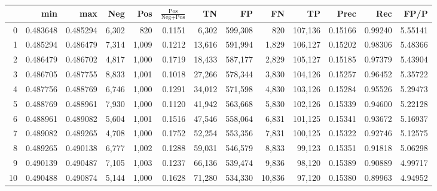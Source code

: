 \begin{tabular}{rrrrrrrrrrrrr}
\toprule
{} &       min &       max &    Neg &    Pos & $\frac{\text{Pos}}{\text{Neg}+\text{Pos}}$ &       TN &       FP &       FN &       TP &     Prec &      Rec &     FP/P \\
\midrule
0   &  0.483648 &  0.485294 &  6,302 &    820 &                                     0.1151 &    6,302 &  599,308 &      820 &  107,136 &  0.15166 &  0.99240 &  5.55141 \\
1   &  0.485294 &  0.486479 &  7,314 &  1,009 &                                     0.1212 &   13,616 &  591,994 &    1,829 &  106,127 &  0.15202 &  0.98306 &  5.48366 \\
2   &  0.486479 &  0.486702 &  4,817 &  1,000 &                                     0.1719 &   18,433 &  587,177 &    2,829 &  105,127 &  0.15185 &  0.97379 &  5.43904 \\
3   &  0.486705 &  0.487755 &  8,833 &  1,001 &                                     0.1018 &   27,266 &  578,344 &    3,830 &  104,126 &  0.15257 &  0.96452 &  5.35722 \\
4   &  0.487756 &  0.488769 &  6,746 &  1,000 &                                     0.1291 &   34,012 &  571,598 &    4,830 &  103,126 &  0.15284 &  0.95526 &  5.29473 \\
5   &  0.488769 &  0.488961 &  7,930 &  1,000 &                                     0.1120 &   41,942 &  563,668 &    5,830 &  102,126 &  0.15339 &  0.94600 &  5.22128 \\
6   &  0.488961 &  0.489082 &  5,604 &  1,001 &                                     0.1516 &   47,546 &  558,064 &    6,831 &  101,125 &  0.15341 &  0.93672 &  5.16937 \\
7   &  0.489082 &  0.489265 &  4,708 &  1,000 &                                     0.1752 &   52,254 &  553,356 &    7,831 &  100,125 &  0.15322 &  0.92746 &  5.12575 \\
8   &  0.489265 &  0.490138 &  6,777 &  1,002 &                                     0.1288 &   59,031 &  546,579 &    8,833 &   99,123 &  0.15351 &  0.91818 &  5.06298 \\
9   &  0.490139 &  0.490487 &  7,105 &  1,003 &                                     0.1237 &   66,136 &  539,474 &    9,836 &   98,120 &  0.15389 &  0.90889 &  4.99717 \\
10  &  0.490488 &  0.490874 &  5,144 &  1,000 &                                     0.1628 &   71,280 &  534,330 &   10,836 &   97,120 &  0.15380 &  0.89963 &  4.94952 \\

\end{tabular}
